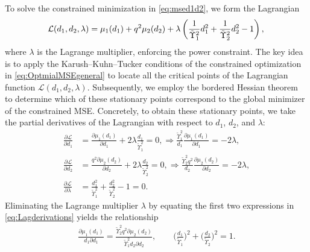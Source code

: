 \documentclass[journal,12pt,onecolumn,draftclsnofoot]{IEEEtran}
\theoremstyle{definition}
\begin{document}
To solve the constrained minimization in \eqref{eq:msed1d2}, we form the Lagrangian
\begin{align}
 \hspace{-2pt}\mathcal{L}(d_1, d_2, \lambda) =  \mu_1(d_1)+ q^2\mu_2(d_2) + \lambda \left( \frac{1}{\tilde{\Upsilon}_1^2}d_1^2 + \frac{1}{\tilde{\Upsilon}_2^2}d_2^2 - 1 \right),  \label{eq:Lagrangian_function}
\end{align}
where $\lambda$ is the Lagrange multiplier, enforcing the power constraint.  The key idea is to apply the Karush–Kuhn–Tucker conditions of the constrained optimization in \eqref{eq:OptmialMSEgeneral} to locate all the critical points of the Lagrangian function  $\mathcal{L}(d_1, d_2, \lambda)$. Subsequently, we employ the bordered Hessian theorem~\cite{d2001bordered} to determine which of these stationary points correspond to the global minimizer of the constrained MSE. Concretely,  to obtain these stationary points, we take the partial derivatives of the Lagrangian with respect to $d_1$, $d_2$, and $\lambda$:
\begin{subequations}
\label{eq:Lagderivations}
\begin{align}
\frac{\partial \mathcal{L}}{\partial d_1} &= \frac{ \partial \mu_1{(d_1)}}{\partial d_1} + 2\lambda \frac{d_1}{\tilde{\Upsilon}_1^2} = 0,  \Rightarrow \frac{\tilde{\Upsilon}_1^2}{d_1} \frac{ \partial \mu_1{(d_1)}}{\partial d_1} =-2\lambda,  \\
\frac{\partial \mathcal{L}}{\partial d_2} &= \frac{q^2\partial \mu_2{(d_2)}}{ \partial d_2} + 2\lambda \frac{d_2}{\tilde{\Upsilon}_2^2} = 0,  \Rightarrow \frac{\tilde{\Upsilon}_2^2q^2}{d_2} \frac{\partial \mu_2{(d_2)}}{\partial d_2} =-2\lambda, \\
\frac{\partial \mathcal{L}}{\partial \lambda} &=\frac{d_1^2}{\tilde{\Upsilon}_1^2} + \frac{d_2^2}{\tilde{\Upsilon}_2^2} - 1= 0.
\end{align}
\end{subequations}
Eliminating the Lagrange multiplier $\lambda$  by equating the first two expressions in  \eqref{eq:Lagderivations} yields the relationship
\begin{align}
\label{eq:MSEequald1d2}
\frac{\partial \mu_1{(d_1)}}{d_1 \partial d_1}  = \frac{\tilde{\Upsilon}_2^2q^2\partial \mu_2{(d_2)}}{\tilde{\Upsilon}_1^2d_2 \partial d_2}, \qquad 
\bigg(\frac{d_1}{\tilde{\Upsilon}_1}\bigg)^2 + \bigg(\frac{d_2}{\tilde{\Upsilon}_2}\bigg)^2 = 1.
\end{align}
\end{document}
